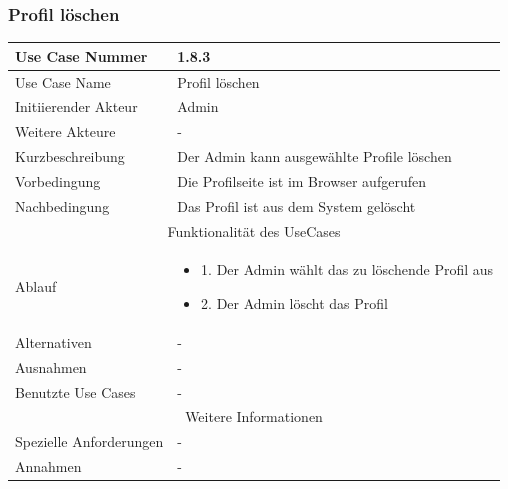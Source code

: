 \documentclass[10pt,a4paper]{article}
\begin{document}
			\subsubsection{Profil l\"oschen}
		\begin{tabular}{|l|p{.5\linewidth}|}
		\hline Use Case Nummer & 1.8.3 \\ 
		\hline Use Case Name & Profil l\"oschen \\ 
		\hline Initiierender Akteur & Admin \\
		\hline Weitere Akteure & - \\
		\hline Kurzbeschreibung & Der Admin kann ausgew\"ahlte Profile l\"oschen \\
		\hline Vorbedingung & Die Profilseite ist im Browser aufgerufen \\
		\hline Nachbedingung & Das Profil ist aus dem System gel\"oscht \\
		\hline \multicolumn{2}{|c|}{Funktionalität des UseCases}\\
		\hline  Ablauf & \begin{itemize}
					\item 1. Der Admin w\"ahlt das zu löschende Profil aus
					\item 2. Der Admin l\"oscht das Profil
				\end{itemize}\\
		\hline Alternativen & - \\
		\hline Ausnahmen & - \\
		\hline Benutzte Use Cases & - \\
		\hline \multicolumn{2}{|c|}{Weitere Informationen} \\
		\hline Spezielle Anforderungen & - \\
		\hline Annahmen & - \\
		\hline
		\end{tabular}
\end{document}
